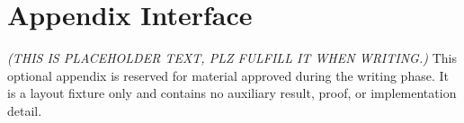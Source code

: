 \appendices
\section{Appendix Interface}\label{app:interface}
\textit{(THIS IS PLACEHOLDER TEXT, PLZ FULFILL IT WHEN WRITING.)}
This optional appendix is reserved for material approved during the writing phase. It is a layout fixture only and contains no auxiliary result, proof, or implementation detail.
